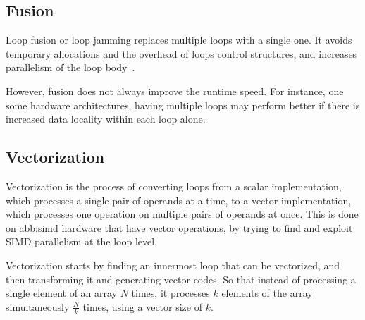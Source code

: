 
\subsection{Fusion}
Loop fusion or loop jamming replaces multiple loops with a single one. It avoids temporary allocations and the overhead of loops control structures, and increases parallelism of the loop body~\cite{transfos}.

However, fusion does not always improve the runtime speed. For instance, one some hardware architectures, having multiple loops may perform better if there is increased data locality within each loop alone.


\subsection{Vectorization}
Vectorization is the process of converting loops from a scalar implementation, which processes a single pair of operands at a time, to a vector implementation, which processes one operation on multiple pairs of operands at once. This is done on \gls{abb:simd} hardware that have vector operations, by trying to find and exploit SIMD parallelism at the loop level. 

Vectorization starts by finding an innermost loop that can be vectorized, and then transforming it and generating vector codes. So that instead of processing a single element of an array $N$ times, it processes $k$ elements of the array simultaneously $\frac{N}{k}$ times, using a vector size of $k$.





